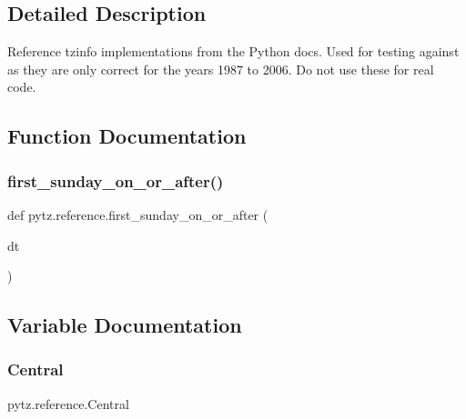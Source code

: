 \subsection{Detailed Description}
\begin{DoxyVerb}Reference tzinfo implementations from the Python docs.
Used for testing against as they are only correct for the years
1987 to 2006. Do not use these for real code.
\end{DoxyVerb}
 

\subsection{Function Documentation}
\mbox{\label{namespacepytz_1_1reference_ac80b6aa380325afc4c9052303580cb02}} 
\subsubsection{\texorpdfstring{first\+\_\+sunday\+\_\+on\+\_\+or\+\_\+after()}{first\_sunday\_on\_or\_after()}}
{\footnotesize\ttfamily def pytz.\+reference.\+first\+\_\+sunday\+\_\+on\+\_\+or\+\_\+after (\begin{DoxyParamCaption}\item[{}]{dt }\end{DoxyParamCaption})}



\subsection{Variable Documentation}
\mbox{\label{namespacepytz_1_1reference_afa66b887c50c4d73210b805cadd4b8f0}} 
\subsubsection{\texorpdfstring{Central}{Central}}
{\footnotesize\ttfamily pytz.\+reference.\+Central}

\mbox{\label{namespacepytz_1_1reference_ac0b06133f0adeb56b6b1774b1270855b}} 
